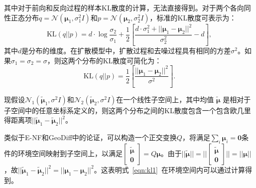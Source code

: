 其中对于前向和反向过程的样本KL散度的计算，无法直接得到。对于两个各向同性正态分布$q = \mathcal{N}(\mathbf{\mu}_1, \sigma_1^2 I)$和$p = \mathcal{N}(\mathbf{\mu}_2, \sigma_2^2 I)$，标准的KL散度可表示为：
\begin{equation}
    \mathrm{KL}(q || p) = d \cdot \log \frac{\sigma_2}{\sigma_1} + \frac{1}{2} \left[ \frac{d \cdot \sigma_1^2 + ||\mathbf{\mu}_1 - \mathbf{\mu}_2||^2}{\sigma_2^2} - d  \right],
\end{equation}
其中$d$是分布的维度。在扩散模型中，扩散过程和去噪过程具有相同的方差$\sigma^2$。如果$\sigma_1 = \sigma_2 = \sigma$，则这两个分布的KL散度可简化为：
\begin{equation}
    \mathrm{KL}(q || p) = \frac{1}{2} \left[ \frac{||\mathbf{\mu}_1 - \mathbf{\mu}_2||^2}{\sigma^2} \right].
    \label{eqn:kl1}
\end{equation}

现假设$\mathcal{N}_1(\tilde{\mathbf{\mu}}_1, \sigma^2 I)$和$\mathcal{N}_2(\tilde{\mathbf{\mu}}_2, \sigma^2 I)$在一个线性子空间上，其中均值 $\tilde{\mathbf{\mu}}$ 是相对于子空间中的任意坐标系定义的，则这两个分布之间的KL散度包含一个包含欧几里得距离项$||\tilde{\mathbf{\mu}}_1 - \tilde{\mathbf{\mu}}_2||^2$。

类似于E-NF\cite{enf_satorras_21}和GeoDiff\cite{geodiff_xu_22}中的论证，可以构造一个正交变换$Q$，将满足$\sum_i \mathbf{\mu}_i = \mathbf{0}$条件的环境空间映射到子空间上，以满足$\begin{bmatrix} \tilde{\mathbf{\mu}} \\ \mathbf{0} \end{bmatrix} = Q \mathbf{\mu}$。由于$||\tilde{\mathbf{\mu}}|| = ||\begin{bmatrix} \tilde{\mathbf{\mu}} \\ \mathbf{0} \end{bmatrix}|| = ||\mathbf{\mu}||$，故$||\tilde{\mathbf{\mu}}_1 - \tilde{\mathbf{\mu}}_2||^2 = ||\mathbf{\mu}_1 - \mathbf{\mu}_2||^2$。这表明式~\ref{eqn:kl1}~在环境空间内可以通过计算得到。

